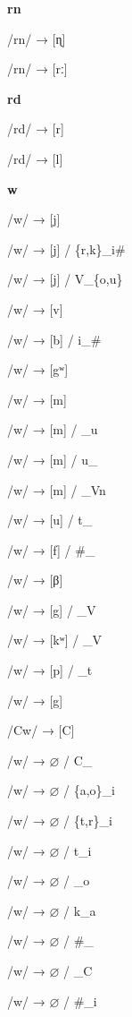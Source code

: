 \begin{center}\textbf{rn}\end{center}
\begin{multicols}{4}
\noindent /rn/ → [ɳ]

\noindent /rn/ → [rː]
\end{multicols}


\begin{center}\textbf{rd}\end{center}
\begin{multicols}{4}
\noindent /rd/ → [r]

\noindent /rd/ → [l]
\end{multicols}


\begin{center}\textbf{w}\end{center}
\begin{multicols}{4}
\noindent /w/ → [j]

\noindent /w/ → [j] / \{r,k\}\_i\#

\noindent /w/ → [j] / V\_\{o,u\}

\noindent /w/ → [v]

\noindent /w/ → [b] / i\_\#

\noindent /w/ → [gʷ]

\noindent /w/ → [m]

\noindent /w/ → [m] / \_u

\noindent /w/ → [m] / u\_

\noindent /w/ → [m] / \_Vn

\noindent /w/ → [u] / t\_

\noindent /w/ → [f] / \#\_

\noindent /w/ → [β]

\noindent /w/ → [g] / \_V

\noindent /w/ → [kʷ] / \_V

\noindent /w/ → [p] / \_t

\noindent /w/ → [g]

\noindent /Cw/ → [C]

\noindent /w/ → $\varnothing$ / C\_

\noindent /w/ → $\varnothing$ / \{a,o\}\_i

\noindent /w/ → $\varnothing$ / \{t,r\}\_i

\noindent /w/ → $\varnothing$ / t\_i

\noindent /w/ → $\varnothing$ / \_o

\noindent /w/ → $\varnothing$ / k\_a

\noindent /w/ → $\varnothing$ / \#\_

\noindent /w/ → $\varnothing$ / \_C

\noindent /w/ → $\varnothing$ / \#\_i
\end{multicols}


